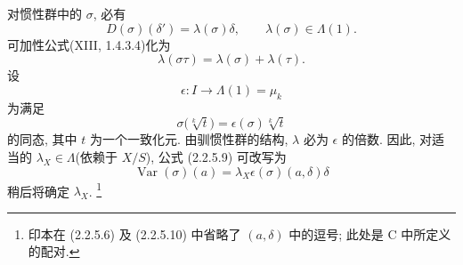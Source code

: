 对惯性群中的 $\sigma$, 必有
\begin{equation}\tag{2.2.5.9}
D(\sigma)(\delta')=\lambda(\sigma)\delta,
\qquad \lambda(\sigma)\in\Lambda(1).
\end{equation}
可加性公式(XIII, 1.4.3.4)化为
\[
\lambda(\sigma\tau)=\lambda(\sigma)+\lambda(\tau).
\]
设
\[
\epsilon:I\longrightarrow\Lambda(1)=\mu_k
\]
为满足
\[
\sigma\bigl(\sqrt[k]{t}\bigr)
=\epsilon(\sigma)\sqrt[k]{t}
\]
的同态, 其中 $t$ 为一个一致化元. 由驯惯性群的结构, $\lambda$ 必为 $\epsilon$ 的倍数. 因此, 对适当的 $\lambda_X\in\Lambda$(依赖于 $X/S$), 公式 (2.2.5.9) 可改写为
\begin{equation}\tag{2.2.5.10}
\operatorname{Var}(\sigma)(a)
=\lambda_X\epsilon(\sigma)(a,\delta)\delta
\end{equation}
稍后将确定 $\lambda_X$.
\footnote{印本在 (2.2.5.6) 及 (2.2.5.10) 中省略了 $(a,\delta)$ 中的逗号; 此处是 C 中所定义的配对.}